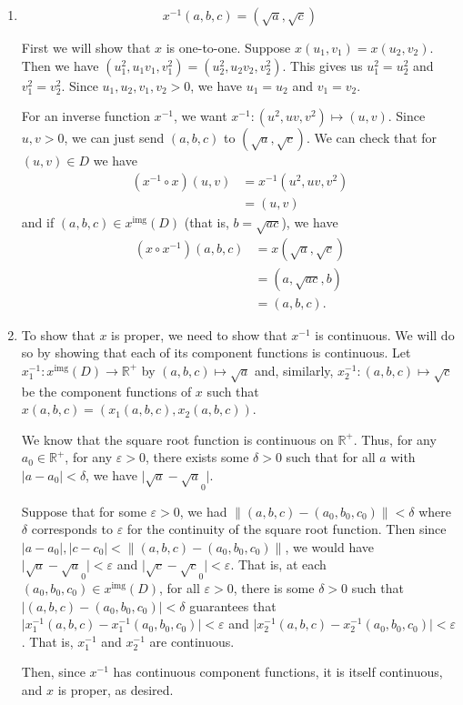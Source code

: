 \documentclass[12 pt, letterpaper]{hmcpset}
\begin{document}
\begin{solution}
	\begin{enumerate}
		\item
			\[
				\boxed{
					x^{-1}(a, b, c) = (\sqrt a, \sqrt c)
				}
			\] 

			First we will show that $x$ is one-to-one. Suppose $x(u_{1}, v_{1}) = x(u_{2}, v_2)$. Then we have $(u_{1}^{2}, u_{1} v_{1}, v_{1}^{2}) = (u_{2}^{2}, u_{2} v_2, v_{2}^{2})$. This gives us $u_{1}^{2} = u_2^{2}$ and $v_{1}^{2} = v_{2}^{2}$. Since $u_{1}, u_{2}, v_{1}, v_{2} > 0$, we have $u_{1} = u_{2}$ and $v_{1} = v_{2}$. 

			For an inverse function $x^{-1}$, we want $x^{-1} : (u^{2}, uv, v^{2}) \mapsto (u, v)$. Since $u, v > 0$, we can just send $(a, b, c)$ to $(\sqrt a, \sqrt c)$. We can check that for $(u, v) \in D$ we have
			\[
				\begin{split}
					(x^{-1} \circ x) (u, v) & = x^{-1}(u^{2}, uv, v^{2}) \\
							      & = (u, v)
				\end{split}
			\]
			and if $(a, b, c) \in x^{\text{img}}(D)$ (that is, $b = \sqrt{ac}$), we have
			\[
				\begin{split}
					(x \circ x^{-1})(a, b, c) & = x(\sqrt a, \sqrt c) \\
								  & = (a, \sqrt{ac}, b) \\
								  & = (a, b, c).
				\end{split}
			\]
		\item
			To show that $x$ is proper, we need to show that $x^{-1}$ is continuous. We will do so by showing that each of its component functions is continuous. Let $x_{1}^{-1} : x^{\text{img}}(D) \to \mathbb{R}^{+}$ by $(a, b, c) \mapsto \sqrt a$ and, similarly, $x_{2}^{-1} : (a, b, c) \mapsto \sqrt c$ be the component functions of $x$ such that $x(a, b, c) = (x_{1}(a, b, c), x_{2}(a, b, c))$. 
			
			We know that the square root function is continuous on $\mathbb{R}^{+}$. Thus, for any $a_{0} \in \mathbb{R}^{+}$, for any $\varepsilon > 0$, there exists some $\delta > 0$ such that for all $a$ with $\lvert a - a_{0} \rvert < \delta$, we have $\lvert \sqrt a - \sqrt a_{0} \rvert$. 

			Suppose that for some $\varepsilon > 0$, we had $\lVert (a, b, c) - (a_{0}, b_{0}, c_{0}) \rVert < \delta$ where $\delta$ corresponds to $\varepsilon$ for the continuity of the square root function. Then since $\lvert a - a_{0} \rvert, \lvert c - c_{0} \rvert < \lVert (a, b, c) - (a_{0}, b_{0}, c_{0}) \rVert$, we would have $\lvert \sqrt a - \sqrt a_{0} \rvert < \varepsilon$ and $\lvert \sqrt c - \sqrt c_{0} \rvert < \varepsilon$. That is, at each $(a_{0}, b_{0}, c_{0}) \in x^{\text{img}}(D)$, for all $\varepsilon > 0$, there is some $\delta > 0$ such that $\lvert (a, b, c) - (a_{0}, b_{0}, c_{0}) \rvert < \delta$ guarantees that $\lvert x_{1}^{-1}(a, b, c) - x_{1}^{-1}(a_{0}, b_{0}, c_{0}) \rvert < \varepsilon$ and $\lvert x_{2}^{-1}(a, b, c) - x_{2}^{-1}(a_{0}, b_{0}, c_{0}) \rvert < \varepsilon$. That is, $x_{1}^{-1}$ and $x_{2}^{-1}$ are continuous. 

			Then, since $x^{-1}$ has continuous component functions, it is itself continuous, and $x$ is proper, as desired.
	\end{enumerate} 
\end{solution}
\end{document}
